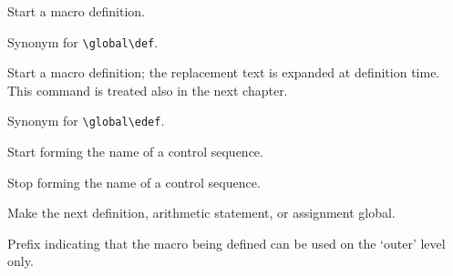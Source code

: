 \label{cschap:def}\label{cschap:gdef}\label{cschap:edef}\label{cschap:xdef}\label{cschap:csname}\label{cschap:endcsname}\label{cschap:global2}\label{cschap:outer}\label{cschap:long}\label{cschap:let}\label{cschap:futurelet}
\begin{inventory}
\item [\cs{def}] 
      Start a macro definition.

\item [\cs{gdef}] 
      Synonym for \verb-\global\def-.

\item [\cs{edef}] 
      Start a macro definition; 
      the replacement text is expanded at definition time.
      This command is treated also in the next chapter.

\item [\cs{xdef}] 
      Synonym for \verb-\global\edef-.

\item [\cs{csname}] 
      Start forming the name of a control sequence.

\item [\cs{endcsname}] 
      Stop forming the name of a control sequence.

\item [\cs{global}] 
      Make the next definition, arithmetic statement,
      or assignment global.

\item [\cs{outer}] 
      Prefix indicating that the macro being defined 
      can be used on the `outer' level only.


\end{inventory}
